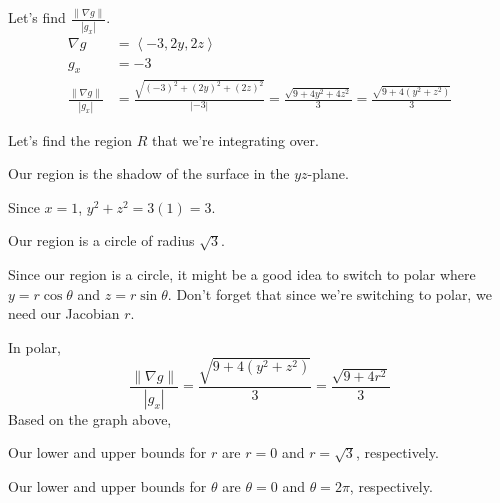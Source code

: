\documentclass{article}
\newcommand{\lra}[1]{\left\langle #1 \right\rangle}
\newcommand{\norm}[1]{\left\lVert #1 \right\rVert}
\begin{document}
Let's find $\displaystyle \frac{\norm{\nabla g}}{\left|g_x\right|}$.
\begin{align*}
    \nabla g &=\lra{-3,2y,2z}\\
    g_x &=-3\\
    \frac{\norm{\nabla g}}{\left|g_x\right|}&=\frac{\sqrt{(-3)^2+(2y)^2+(2z)^2}}{\left|-3\right|}=\frac{\sqrt{9+4y^2+4z^2}}{3}=\frac{\sqrt{9+4(y^2+z^2)}}{3}
\end{align*}

Let's find the region $R$ that we're integrating over.

Our region is the shadow of the surface in the $yz$-plane. 

Since $x=1$, $y^2+z^2=3(1)=3$.

Our region is a circle of radius $\sqrt{3}$.
\begin{center}
\end{center}
Since our region is a circle, it might be a good idea to switch to polar where $y=r\cos\theta$ and $z=r\sin\theta$. Don't forget that since we're switching to polar, we need our Jacobian $r$.

In polar,
\begin{equation*}
    \frac{\norm{\nabla g}}{\left|g_x\right|}=\frac{\sqrt{9+4(y^2+z^2)}}{3}=\frac{\sqrt{9+4r^2}}{3}
\end{equation*}
Based on the graph above,

Our lower and upper bounds for $r$ are $r=0$ and $r=\sqrt{3}$, respectively.

Our lower and upper bounds for $\theta$ are $\theta=0$ and $\theta=2\pi$, respectively.
\end{document}
